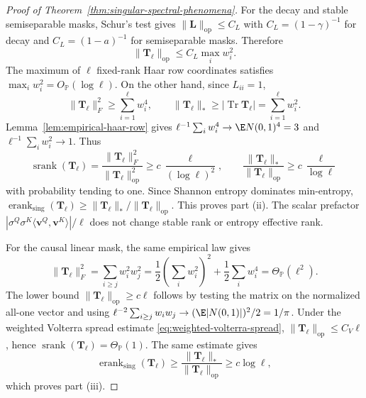 \documentclass{article}
\newcommand{\Prob}{\mathbb{P}}
\newcommand{\srank}{\operatorname{srank}}
\newcommand{\erank}{\operatorname{erank}}
\newcommand{\op}{\operatorname{op}}
\newcommand{\bL}{\mathbf{L}}
\newcommand{\bT}{\mathbf{T}}
\newcommand{\bv}{\mathbf{v}}
\theoremstyle{remark}
\begin{document}
\begin{proof}[Proof of Theorem~\ref{thm:singular-spectral-phenomena}]
For the decay and stable semiseparable masks, Schur's test gives
$\|\bL\|_{\op}\leq C_L$ with $C_L=(1-\gamma)^{-1}$ for decay and
$C_L=(1-a)^{-1}$ for semiseparable masks.  Therefore
\[
    \|\bT_\ell\|_{\op}
    \leq
    C_L\max_i w_i^2.
\]
The maximum of $\ell$ fixed-rank Haar row coordinates satisfies
$\max_iw_i^2=O_{\Prob}(\log\ell)$.  On the other hand, since $L_{ii}=1$,
\[
    \|\bT_\ell\|_F^2
    \geq
    \sum_{i=1}^{\ell}w_i^4,
    \qquad
    \|\bT_\ell\|_*
    \geq
    |\operatorname{Tr}\bT_\ell|
    =
    \sum_{i=1}^{\ell}w_i^2.
\]
Lemma~\ref{lem:empirical-haar-row} gives
$\ell^{-1}\sum_iw_i^4\to\E N(0,1)^4=3$ and
$\ell^{-1}\sum_iw_i^2\to1$.  Thus
\[
    \srank(\bT_\ell)
    =
    \frac{\|\bT_\ell\|_F^2}{\|\bT_\ell\|_{\op}^2}
    \geq
    c\,\frac{\ell}{(\log\ell)^2},
    \qquad
    \frac{\|\bT_\ell\|_*}{\|\bT_\ell\|_{\op}}
    \geq
    c\,\frac{\ell}{\log\ell}
\]
with probability tending to one.  Since Shannon entropy dominates min-entropy,
$\erank_{\mathrm{sing}}(\bT_\ell)\geq
\|\bT_\ell\|_*/\|\bT_\ell\|_{\op}$.  This proves part (ii).  The scalar
prefactor $|\sigma^Q\sigma^K\langle\bv^Q,\bv^K\rangle|/\ell$ does not change
stable rank or entropy effective rank.

For the causal linear mask, the same empirical law gives
\[
    \|\bT_\ell\|_F^2
    =
    \sum_{i\geq j}w_i^2w_j^2
    =
    \frac12\left(\sum_iw_i^2\right)^2
    +
    \frac12\sum_iw_i^4
    =
    \Theta_{\Prob}(\ell^2).
\]
The lower bound $\|\bT_\ell\|_{\op}\geq c\ell$ follows by testing the matrix on
the normalized all-one vector and using
$\ell^{-2}\sum_{i\geq j}w_iw_j\to(\E|N(0,1)|)^2/2=1/\pi$.  Under the weighted
Volterra spread estimate \eqref{eq:weighted-volterra-spread},
$\|\bT_\ell\|_{\op}\leq C_V\ell$, hence
$\srank(\bT_\ell)=\Theta_{\Prob}(1)$.  The same estimate gives
\[
    \erank_{\mathrm{sing}}(\bT_\ell)
    \geq
    \frac{\|\bT_\ell\|_*}{\|\bT_\ell\|_{\op}}
    \geq
    c\log\ell,
\]
which proves part (iii).
\end{proof}
\end{document}

